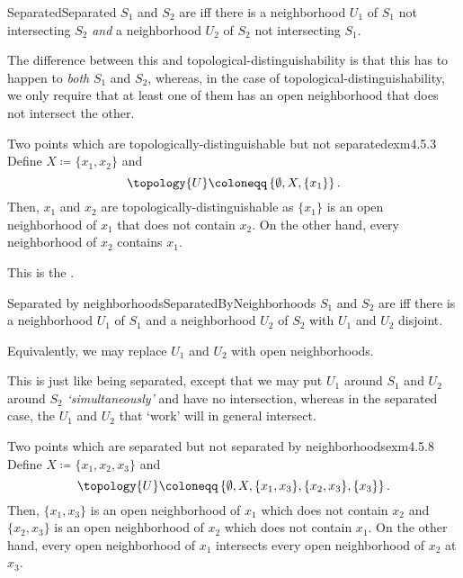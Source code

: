 \begin{dfn}{Separated}{Separated}
$S_1$ and $S_2$ are  iff there is a neighborhood $U_1$ of $S_1$ not intersecting $S_2$ \emph{and} a neighborhood $U_2$ of $S_2$ not intersecting $S_1$.
\begin{rmk}
The difference between this and topological-distinguishability is that this has to happen to \emph{both} $S_1$ and $S_2$, whereas, in the case of topological-distinguishability, we only require that at least one of them has an open neighborhood that does not intersect the other.
\end{rmk}
\end{dfn}
\begin{exm}{Two points which are topolo\-gically-distinguish\-able but not separated}{exm4.5.3}
Define $X\coloneqq \{ x_1,x_2\}$ and
\begin{equation}
\topology{U}\coloneqq \left\{ \emptyset ,X,\{ x_1\} \right\} .
\end{equation}
Then, $x_1$ and $x_2$ are topologically-distinguishable as $\{ x_1\}$ is an open neighborhood of $x_1$ that does not contain $x_2$.  On the other hand, every neighborhood of $x_2$ contains $x_1$.
\begin{rmk}
This is the .
\end{rmk}
\end{exm}
\begin{dfn}{Separated by neighborhoods}{SeparatedByNeighborhoods}
$S_1$ and $S_2$ are  iff there is a neighborhood $U_1$ of $S_1$ and a neighborhood $U_2$ of $S_2$ with $U_1$ and $U_2$ disjoint.
\begin{rmk}
Equivalently, we may replace $U_1$ and $U_2$ with open neighborhoods.
\end{rmk}
\begin{rmk}
This is just like being separated, except that we may put $U_1$ around $S_1$ and $U_2$ around $S_2$ \emph{`simultaneously'} and have no intersection, whereas in the separated case, the $U_1$ and $U_2$ that `work' will in general intersect.
\end{rmk}
\end{dfn}
\begin{exm}{Two points which are separated but not separated by neighborhoods}{exm4.5.8}
Define $X\coloneqq \{ x_1,x_2,x_3\}$ and
\begin{equation}
\topology{U}\coloneqq \left\{ \emptyset ,X,\{ x_1,x_3\} ,\{ x_2,x_3\} ,\{ x_3\} \right\} .
\end{equation}
Then, $\{ x_1,x_3\}$ is an open neighborhood of $x_1$ which does not contain $x_2$ and $\{ x_2,x_3\}$ is an open neighborhood of $x_2$ which does not contain $x_1$.  On the other hand, every open neighborhood of $x_1$ intersects every open neighborhood of $x_2$ at $x_3$.
\end{exm}
